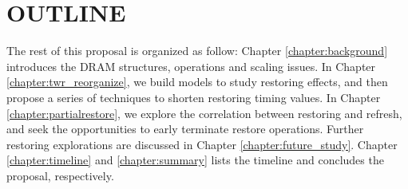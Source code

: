 \section{OUTLINE}
\label{outline}
The rest of this proposal is organized as follow:  
Chapter \ref{chapter:background} introduces the DRAM structures, operations and scaling issues.
In Chapter \ref{chapter:twr_reorganize}, we build models to study restoring effects, and then propose a series of techniques to shorten restoring timing values.
In Chapter \ref{chapter:partialrestore}, we explore the correlation between restoring and refresh, and seek the opportunities to early terminate restore operations.
Further restoring explorations are discussed in Chapter \ref{chapter:future_study}.
Chapter \ref{chapter:timeline} and \ref{chapter:summary} lists the timeline and concludes the proposal, respectively.








